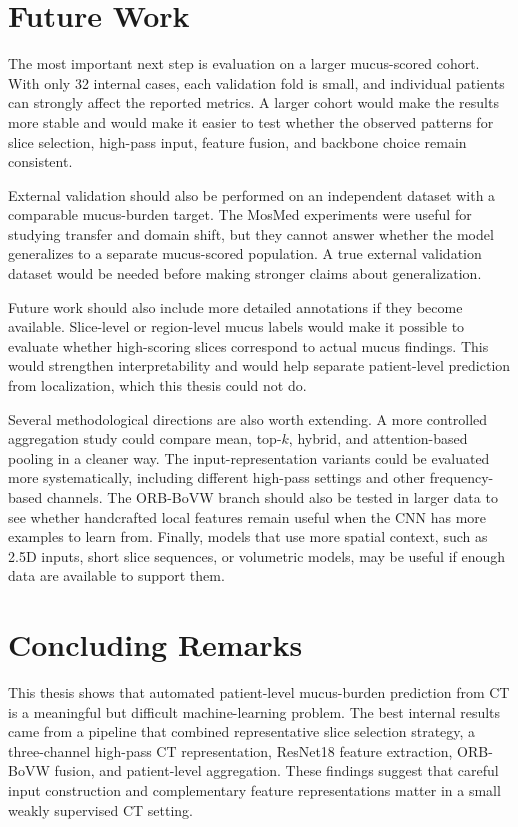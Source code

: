 \section{Future Work}
The most important next step is evaluation on a larger mucus-scored cohort. With only 32 internal cases, each validation fold is small, and individual patients can strongly affect the reported metrics. A larger cohort would make the results more stable and would make it easier to test whether the observed patterns for slice selection, high-pass input, feature fusion, and backbone choice remain consistent.

External validation should also be performed on an independent dataset with a comparable mucus-burden target. The MosMed experiments were useful for studying transfer and domain shift, but they cannot answer whether the model generalizes to a separate mucus-scored population. A true external validation dataset would be needed before making stronger claims about generalization.

Future work should also include more detailed annotations if they become available. Slice-level or region-level mucus labels would make it possible to evaluate whether high-scoring slices correspond to actual mucus findings. This would strengthen interpretability and would help separate patient-level prediction from localization, which this thesis could not do.

Several methodological directions are also worth extending. A more controlled aggregation study could compare mean, top-\(k\), hybrid, and attention-based pooling in a cleaner way. The input-representation variants could be evaluated more systematically, including different high-pass settings and other frequency-based channels. The ORB-BoVW branch should also be tested in larger data to see whether handcrafted local features remain useful when the CNN has more examples to learn from. Finally, models that use more spatial context, such as 2.5D inputs, short slice sequences, or volumetric models, may be useful if enough data are available to support them.


\section{Concluding Remarks}
This thesis shows that automated patient-level mucus-burden prediction from CT is a meaningful but difficult machine-learning problem. The best internal results came from a pipeline that combined representative slice selection strategy, a three-channel high-pass CT representation, ResNet18 feature extraction, ORB-BoVW fusion, and patient-level aggregation. These findings suggest that careful input construction and complementary feature representations matter in a small weakly supervised CT setting.

